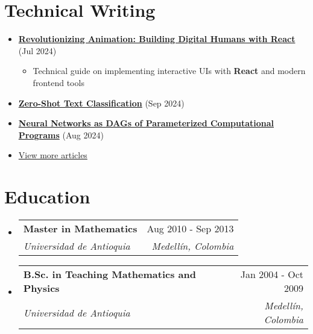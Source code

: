 \documentclass[letterpaper,11pt]{article}
\makeatletter
\newcommand{\resumeSubheading}[4]{
  \vspace{-2pt}
  \item[]
  \begin{tabular*}{\textwidth}{@{\extracolsep{\fill}}l r}
    \textbf{#1} & #2 \\
    \textit{#3} & \textit{#4} \\
  \end{tabular*}
  \vspace{-5pt}
}
\newcommand{\normalfaExternalLink}{{\mdseries\faExternalLink}}
\makeatother
\begin{document}
\section{Technical Writing}
\begin{itemize}[leftmargin=*]    
    \item \textbf{\href{https://www.asanchezyali.com/blog/ai-avatars/20240703DigitalHuman}{Revolutionizing Animation: Building Digital Humans with React}} (Jul 2024)
    \begin{itemize}
        \item Technical guide on implementing interactive UIs with \textbf{React} and modern frontend tools
    \end{itemize}
    \item \textbf{\href{https://www.asanchezyali.com/blog/en/ai/20240917ZeroShot}{Zero-Shot Text Classification}} (Sep 2024)
    \item \textbf{\href{https://www.asanchezyali.com/blog/en/differentiable-programming/20240923DifferentiablePrograms}{Neural Networks as DAGs of Parameterized Computational Programs}} (Aug 2024)
    \item   \href{https://www.asanchezyali.com/}{View more articles \normalfaExternalLink}
\end{itemize}

\section{Education}
\begin{itemize}[leftmargin=0pt, itemindent=0pt, label={}]
\resumeSubheading
{Master in Mathematics}{Aug 2010 - Sep 2013}
{Universidad de Antioquia}{Medellín, Colombia}

\resumeSubheading
{B.Sc. in Teaching Mathematics and Physics}{Jan 2004 - Oct 2009}
{Universidad de Antioquia}{Medellín, Colombia}
\end{itemize}
\end{document}
